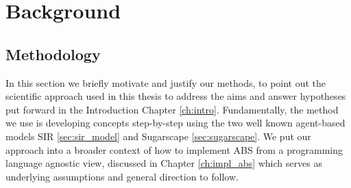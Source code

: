 \chapter{Background}
\label{ch:background}







\section{Methodology}

In this section we briefly motivate and justify our methods, to point out the scientific approach used in this thesis to address the aims and answer hypotheses put forward in the Introduction Chapter \ref{ch:intro}. Fundamentally, the method we use is developing concepts step-by-step using the two well known agent-based models SIR \ref{sec:sir_model} and Sugarscape \ref{sec:sugarscape}. We put our approach into a broader context of how to implement ABS from a programming language agnostic view, discussed in Chapter \ref{ch:impl_abs} which serves as underlying assumptions and general direction to follow.

